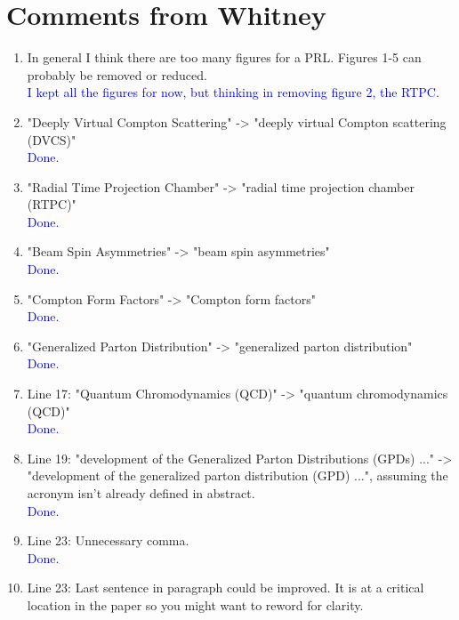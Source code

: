 \documentclass[a4paper,11pt,twoside]{article}
\date{\today}
\begin{document}
\section{Comments from Whitney}


\begin{enumerate}
\item In general I think there are too many figures for a PRL.
Figures 1-5 can probably be removed or reduced.\\
\textcolor{blue}{I kept all the figures for now, but thinking in removing 
figure 2, the RTPC. }

\item "Deeply Virtual Compton Scattering" -> "deeply virtual Compton
scattering (DVCS)"\\
\textcolor{blue}{Done. }
  
\item "Radial Time Projection Chamber" -> "radial time projection chamber
(RTPC)"\\
\textcolor{blue}{Done. }
  
\item "Beam Spin Asymmetries" -> "beam spin asymmetries"\\
\textcolor{blue}{Done. }
  
\item "Compton Form Factors" -> "Compton form factors"\\
\textcolor{blue}{Done. }
  
\item "Generalized Parton Distribution" -> "generalized parton distribution"\\
\textcolor{blue}{Done. }
  
\item Line 17: "Quantum Chromodynamics (QCD)" -> "quantum chromodynamics
(QCD)"\\
\textcolor{blue}{Done. }
  
\item Line 19: "development of the Generalized Parton Distributions (GPDs)
..." -> "development of the generalized parton distribution (GPD) ...",
assuming the acronym isn't already defined in abstract.\\
\textcolor{blue}{Done. }
  
\item Line 23: Unnecessary comma.\\
\textcolor{blue}{Done. }
  
\item Line 23: Last sentence in paragraph could be improved. It is at a
critical location in the paper so you might want to reword for clarity.\\
  

\end{enumerate}
\end{document}
